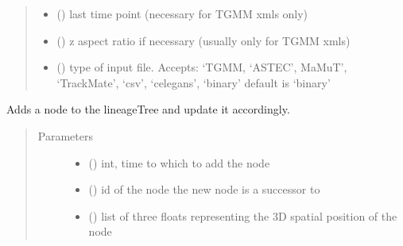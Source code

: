 \documentclass[letterpaper,10pt,english]{sphinxmanual}
\begin{document}
\begin{fulllineitems}
\begin{fulllineitems}
\begin{quote}
\begin{description}
\begin{itemize}
\item {} 
 () \textendash{} last time point (necessary for TGMM xmls only)

\item {} 
 () \textendash{} z aspect ratio if necessary (usually only for TGMM xmls)

\item {} 
 () \textendash{} type of input file. Accepts:
‘TGMM, ‘ASTEC’, MaMuT’, ‘TrackMate’, ‘csv’, ‘celegans’, ‘binary’
default is ‘binary’

\end{itemize}

\end{description}\end{quote}

\end{fulllineitems}


\begin{fulllineitems}
\label{\detokenize{index:LineageTree.lineageTree.add_node}}
Adds a node to the lineageTree and update it accordingly.
\begin{quote}\begin{description}
\item[{Parameters}] \leavevmode\begin{itemize}
\item {} 
 () \textendash{} int, time to which to add the node

\item {} 
 () \textendash{} id of the node the new node is a successor to

\item {} 
 (\sphinxstyleliteralemphasis{\sphinxupquote{{[}}}\sphinxstyleliteralemphasis{\sphinxupquote{, }}\sphinxstyleliteralemphasis{\sphinxupquote{{]}}}) \textendash{} list of three floats representing the 3D spatial position of the node


\end{itemize}
\end{description}
\end{quote}
\end{fulllineitems}
\end{fulllineitems}
\end{document}
